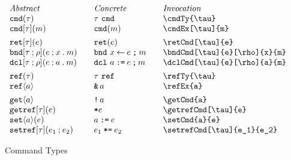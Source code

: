 \documentclass[11pt]{article}
\begin{document}
\begin{figure}

  \begin{small}
    \begin{displaymath}
      \begin{array}{l@{\qquad}l@{\qquad}l@{\qquad}l}
        \textit{Abstract} & \textit{Concrete} & \textit{Invocation} \\
        \cmdTy{\tau}               & \cmdTy*{\tau}               & \verb|\cmdTy{\tau}|               \\
        \cmdEx[\tau]{m}            & \cmdEx*{m}                  & \verb|\cmdEx[\tau]{m}|            \\[1ex]
        \retCmd[\tau]{e}           & \retCmd*{e}                 & \verb|\retCmd[\tau]{e}|           \\
        \bndCmd[\tau]{e}[\rho]{x}{m}           & \bndCmd*{e}{x}{m}           & \verb|\bndCmd[\tau]{e}[\rho]{x}{m}|           \\
        \dclCmd[\tau]{e}[\rho]{a}{m}           & \dclCmd*{e}{a}{m}           & \verb|\dclCmd[\tau]{e}[\rho]{a}{m}|           \\[1ex]
        \refTy{\tau}               & \refTy*{\tau}               & \verb|\refTy{\tau}| \\
        \refEx{a}                  & \refEx*{a}                  & \verb|\refEx{a}|                  \\[1ex]
        \getCmd{a}                 & \getCmd*{a}                 & \verb|\getCmd{a}|                 \\
        \getrefCmd[\tau]{e}        & \getrefCmd*{e}              & \verb|\getrefCmd[\tau]{e}|        \\
        \setCmd{a}{e}              & \setCmd*{a}{e}              & \verb|\setCmd{a}{e}|              \\
        \setrefCmd[\tau]{e_1}{e_2} & \setrefCmd*[\tau]{e_1}{e_2} & \verb|\setrefCmd[\tau]{e_1}{e_2}|
      \end{array}
    \end{displaymath}
  \end{small}

  \caption{Command Types}
  \label{fig:cmd}
\end{figure}
\end{document}
